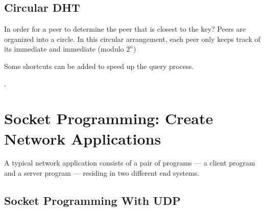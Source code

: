     \subsection{Circular DHT}
    
    \hf In order for a peer to determine the peer that is closest to the key? Peers are organized into a circle. 
    In this circular arrangement, each peer only keeps track of its immediate  and immediate  (modulo $2^n$)



    Some shortcuts can be added to speed up the query process.

    .


\section{Socket Programming: Create Network Applications}

\hf A typical network application consists of a pair of programs --- a client program and a server
program --- residing in two different end systems.


\subsection{Socket Programming With UDP}

\hf
